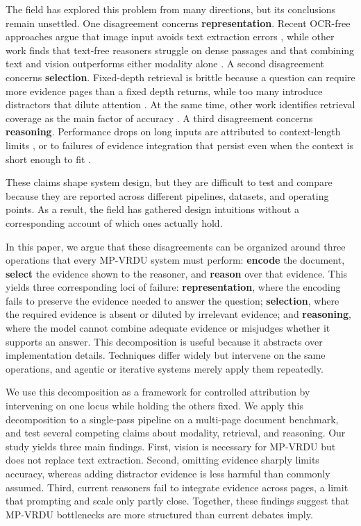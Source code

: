 \documentclass[11pt]{article}
\begin{document}
The field has explored this problem from many directions, but its conclusions remain unsettled. One disagreement concerns \textbf{representation}. Recent OCR-free approaches argue that image input avoids text extraction errors \citep{tanaka2025vdocrag,zheng2026docvstar}, while other work finds that text-free reasoners struggle on dense passages \citep{hannan2025docslm} and that combining text and vision outperforms either modality alone \citep{han2025mdocagent,suri2025visdom}. 
%
A second disagreement concerns \textbf{selection}. Fixed-depth retrieval is brittle because a question can require more evidence pages than a fixed depth returns, while too many introduce distractors that dilute attention \citep{yan2025docseeker,li2025avir}. At the same time, other work identifies retrieval coverage as the main factor of accuracy \citep{liu2025sleuth,zhu2025doclens}. 
%
A third disagreement concerns \textbf{reasoning}. Performance drops on long inputs are attributed to context-length limits \citep{wang2024mmniah,liu2024lost}, or to failures of evidence integration that persist even when the context is short enough to fit \citep{zheng2026docvstar,guo2026end}. 

These claims shape system design, but they are difficult to test and compare because they are reported across different pipelines, datasets, and operating points. As a result, the field has gathered design intuitions without a corresponding account of which ones actually hold.

In this paper, we argue that these disagreements can be organized around three operations that every MP-VRDU system must perform: \textbf{encode} the document, \textbf{select} the evidence shown to the reasoner, and \textbf{reason} over that evidence. 
%
This yields three corresponding loci of failure: \textbf{representation}, where the encoding fails to preserve the evidence needed to answer the question; \textbf{selection}, where the required evidence is absent or diluted by irrelevant evidence; and \textbf{reasoning}, where the model cannot combine adequate evidence or misjudges whether it supports an answer. 
This decomposition is useful because it abstracts over implementation details. Techniques differ widely but intervene on the same operations, and agentic or iterative systems merely apply them repeatedly.

We use this decomposition as a framework for controlled attribution by intervening on one locus while holding the others fixed. We apply this decomposition to a single-pass pipeline on a multi-page document benchmark, and test several competing claims about modality, retrieval, and reasoning.
%
Our study yields three main findings. First, vision is necessary for MP-VRDU but does not replace text extraction. Second, omitting evidence sharply limits accuracy, whereas adding distractor evidence is less harmful than commonly assumed. Third, current reasoners fail to integrate evidence across pages, a limit that prompting and scale only partly close. Together, these findings suggest that MP-VRDU bottlenecks are more structured than current debates imply.
\end{document}
